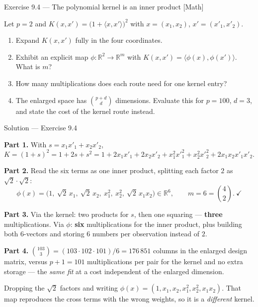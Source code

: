 \documentclass[aspectratio=169,11pt]{beamer}
\begin{document}
\begin{frame}{Exercise 9.4 --- The polynomial kernel is an inner product [Math]}
\begin{exercise}
  Let $p=2$ and $K(x,x') = \big(1+\langle x,x'\rangle\big)^2$ with
  $x=(x_1,x_2)$, $x'=(x'_1,x'_2)$.
  \begin{enumerate}
    \item Expand $K(x,x')$ fully in the four coordinates.
    \item Exhibit an explicit map $\phi:\mathbb{R}^2\to\mathbb{R}^m$ with
          $K(x,x')=\langle\phi(x),\phi(x')\rangle$. What is $m$?
    \item How many multiplications does each route need for one kernel entry?
    \item The enlarged space has $\binom{p+d}{d}$ dimensions. Evaluate this for
          $p=100$, $d=3$, and state the cost of the kernel route instead.
  \end{enumerate}
\end{exercise}
\end{frame}

\begin{frame}{Solution --- Exercise 9.4}
\begin{solutionbox}
  \scriptsize
  \textbf{Part 1.} With $s = x_1x'_1 + x_2x'_2$,
  \[
    K = (1+s)^2 = 1 + 2s + s^2
      = 1 + 2x_1x'_1 + 2x_2x'_2 + x_1^2x'^2_1 + x_2^2x'^2_2
        + 2x_1x_2x'_1x'_2 .
  \]

  \textbf{Part 2.} Read the six terms as one inner product, splitting each
  factor $2$ as $\sqrt2\cdot\sqrt2$:
  \[
    \phi(x) = \big(1,\ \sqrt2\,x_1,\ \sqrt2\,x_2,\ x_1^2,\ x_2^2,\
                    \sqrt2\,x_1x_2\big) \in \mathbb{R}^6,
    \qquad m = 6 = \binom{4}{2}. \ \checkmark
  \]

  \textbf{Part 3.} Via the kernel: two products for $s$, then one squaring ---
  \textbf{three} multiplications. Via $\phi$: \textbf{six} multiplications for
  the inner product, plus building both $6$-vectors and storing $6$ numbers per
  observation instead of $2$.

  \textbf{Part 4.}
  $\binom{103}{3} = (103\cdot102\cdot101)/6 = 176\,851$ columns in the enlarged
  design matrix, versus $p+1 = 101$ multiplications per pair for the kernel and
  no extra storage --- the \emph{same fit} at a cost independent of the
  enlarged dimension.
\end{solutionbox}
\begin{mistake}
  Dropping the $\sqrt2$ factors and writing
  $\phi(x)=(1,x_1,x_2,x_1^2,x_2^2,x_1x_2)$. That map reproduces the cross
  terms with the wrong weights, so it is a \emph{different} kernel.
\end{mistake}
\end{frame}
\end{document}
